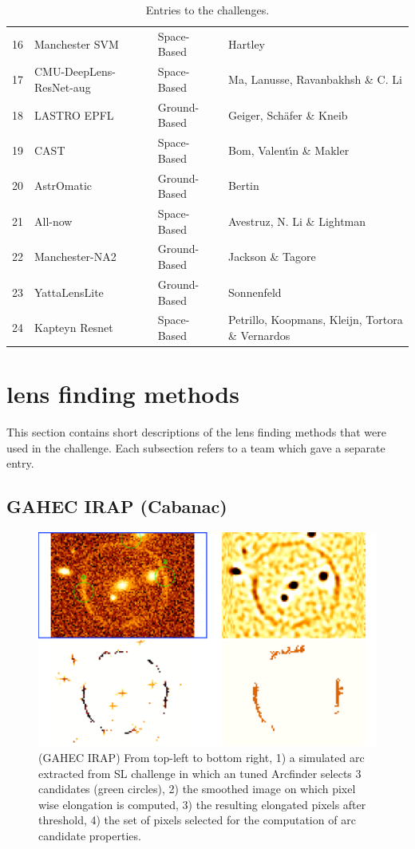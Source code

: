\documentclass[useAMS,usenatbib]{mnras}
\begin{document}
\begin{table}
\begin{tabular}{rlll}
  16 & Manchester SVM & Space-Based &  Hartley  \\ 
  17 & CMU-DeepLens-ResNet-aug & Space-Based & Ma,  Lanusse, Ravanbakhsh \& C. Li \\ 
  18 & LASTRO EPFL & Ground-Based & Geiger, Sch\"{a}fer \& Kneib   \\ 
  19 & CAST & Space-Based & Bom, Valent\'{\i}n \& Makler  \\ 
  20 & AstrOmatic & Ground-Based & Bertin  \\ 
  21 & All-now & Space-Based & Avestruz, N. Li \& Lightman   \\ 
  22 & Manchester-NA2 & Ground-Based & Jackson \& Tagore  \\ 
  23 & YattaLensLite & Ground-Based & Sonnenfeld   \\ 
  24 & Kapteyn Resnet & Space-Based & Petrillo, Koopmans, Kleijn, Tortora \& Vernardos \\ 
   \hline
\end{tabular}
\caption{Entries to the challenges.}
\label{table:entries}
\end{table}

\section{lens finding methods}
\label{sec:methods}

This section contains short descriptions of the lens finding methods that were used in 
the challenge.  Each subsection refers to a team which gave a separate entry.

\subsection{GAHEC IRAP (Cabanac)}

\begin{figure}
 \includegraphics[width=\columnwidth]{figures/arcmethod.pdf}
 \caption{ (GAHEC IRAP) From top-left to bottom right, 1) a simulated arc extracted from SL challenge in which an tuned Arcfinder selects 3 candidates (green circles), 2) the smoothed image on which pixel wise elongation is computed, 3) the resulting elongated pixels after threshold, 4) the set of pixels selected for the computation of arc candidate properties. }
 \label{fig:Cabanac}
\end{figure}
\end{document}
